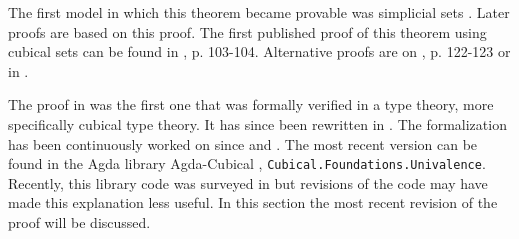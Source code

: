 \documentclass[11pt,a4paper,twoside,xetex,draft]{book}
\newcommand{\type}{\mathcal{U}}
\begin{document}
The first model in which this theorem became provable was simplicial sets \cite{Kapulkin2012}. Later proofs are based on this proof. The first published proof of this theorem using cubical sets can be found in \cite{Huber2016}, p. 103-104. Alternative proofs are on \cite{Huber2016}, p. 122-123 or in \cite{Bezem2018}. 

The proof in \cite{Huber2016} was the first one that was formally verified in a type theory, more specifically cubical type theory. It has since been rewritten in \cite{Weinberger2016}. The formalization has been continuously worked on since \cite{Moertberg2015} and \cite{Cohen2016}. The most recent version can be found in the Agda library Agda-Cubical  \cite{Moertberg2018}, \texttt{Cubical.Foundations.Univalence}. Recently, this library code was surveyed in \cite{Moertberg2018a} but revisions of the code may have made this explanation less useful. In this section the most recent revision of the proof will be discussed.


% 
\end{document}
